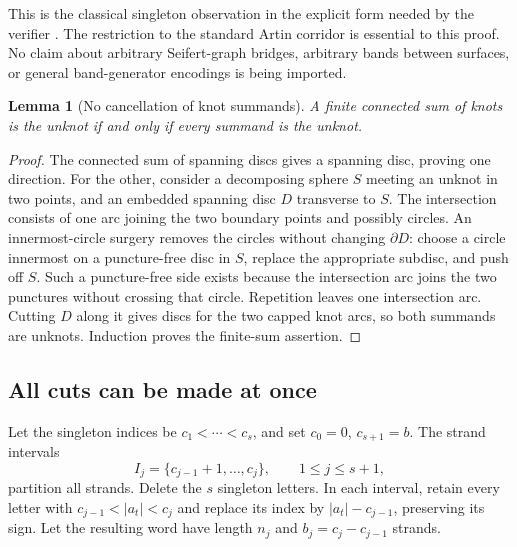 \documentclass[11pt,letterpaper]{article}
\newtheorem{lemma}[theorem]{Lemma}
\theoremstyle{definition}
\begin{document}
This is the classical singleton observation in the explicit form needed by the verifier \cite{vancott}. The restriction to the standard Artin corridor is essential to this proof. No claim about arbitrary Seifert-graph bridges, arbitrary bands between surfaces, or general band-generator encodings is being imported.

\begin{lemma}[No cancellation of knot summands]
\label{lem:no-cancel}
A finite connected sum of knots is the unknot if and only if every summand is the unknot.
\end{lemma}
\begin{proof}
The connected sum of spanning discs gives a spanning disc, proving one direction. For the other, consider a decomposing sphere $S$ meeting an unknot in two points, and an embedded spanning disc $D$ transverse to $S$. The intersection consists of one arc joining the two boundary points and possibly circles. An innermost-circle surgery removes the circles without changing $\partial D$: choose a circle innermost on a puncture-free disc in $S$, replace the appropriate subdisc, and push off $S$. Such a puncture-free side exists because the intersection arc joins the two punctures without crossing that circle. Repetition leaves one intersection arc. Cutting $D$ along it gives discs for the two capped knot arcs, so both summands are unknots. Induction proves the finite-sum assertion.
\end{proof}

\subsection{All cuts can be made at once}
Let the singleton indices be $c_1<\cdots<c_s$, and set $c_0=0$, $c_{s+1}=b$. The strand intervals
\[
 I_j=\{c_{j-1}+1,\ldots,c_j\},\qquad 1\le j\le s+1,
\]
partition all strands. Delete the $s$ singleton letters. In each interval, retain every letter with $c_{j-1}<|a_t|<c_j$ and replace its index by $|a_t|-c_{j-1}$, preserving its sign. Let the resulting word have length $n_j$ and $b_j=c_j-c_{j-1}$ strands.
\end{document}
